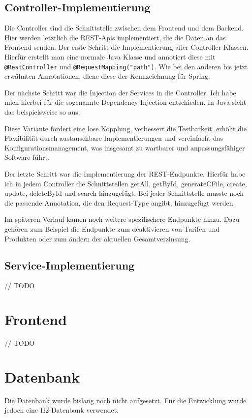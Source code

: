\subsection{Controller-Implementierung}
Die Controller sind die Schnittstelle zwischen dem Frontend und dem Backend. Hier werden letztlich die REST-Apis implementiert, die die Daten an das Frontend senden.
Der erste Schritt die Implementierung aller Controller Klassen. Hierfür erstellt man eine normale Java Klasse und annotiert diese mit \texttt{@RestController} und \texttt{@RequestMapping("path")}.
Wie bei den anderen bis jetzt erwähnten Annotationen, diene diese der Kennzeichnung für Spring.

Der nächste Schritt war die Injection der Services in die Controller. Ich habe mich hierbei für die sogenannte Dependency Injection entschieden.
In Java sieht das beispielsweise so aus:



Diese Variante fördert eine lose Kopplung, verbessert die Testbarkeit, erhöht die Flexibilität durch austauschbare Implementierungen 
und vereinfacht das Konfigurationsmanagement, was insgesamt zu wartbarer und anpassungsfähiger Software führt. \cite{seemann2019dependency}

Der letzte Schritt war die Implementierung der REST-Endpunkte. Hierfür habe ich in jedem Controller die Schnittstellen getAll, getById, generateCFile, create, update, deleteById und search hinzugefügt.
Bei jeder Schnittstelle musste noch die passende Annotation, die den Request-Type angibt, hinzugefügt werden.

Im späteren Verlauf kamen noch weitere spezifischere Endpunkte hinzu. Dazu gehören zum Beispiel die Endpunkte zum deaktivieren von Tarifen und Produkten oder 
zum ändern der aktuellen Gesamtverzinsung.
\subsection{Service-Implementierung}
// TODO
\section{Frontend}
// TODO
\section{Datenbank}
Die Datenbank wurde bislang noch nicht aufgesetzt. Für die Entwicklung wurde jedoch eine H2-Datenbank verwendet. 

